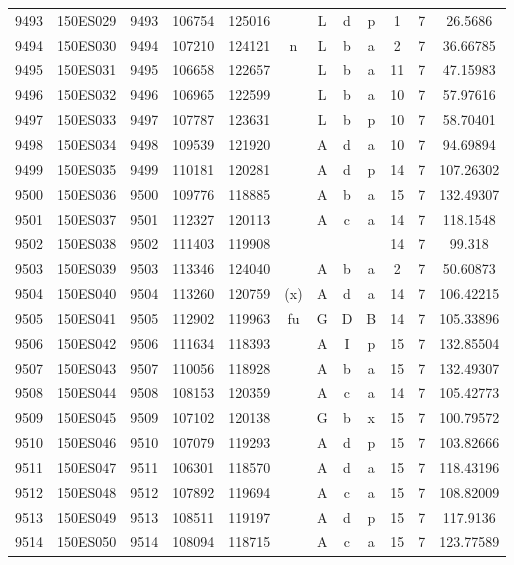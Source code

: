 \begin{tabular}{|*{12}{c|}}
9493 & 150ES029 & 9493 & 106754 & 125016 &  & L & d & p & 1 & 7 & 26.5686 \\ 
9494 & 150ES030 & 9494 & 107210 & 124121 & n & L & b & a & 2 & 7 & 36.66785 \\ 
9495 & 150ES031 & 9495 & 106658 & 122657 &  & L & b & a & 11 & 7 & 47.15983 \\ 
9496 & 150ES032 & 9496 & 106965 & 122599 &  & L & b & a & 10 & 7 & 57.97616 \\ 
9497 & 150ES033 & 9497 & 107787 & 123631 &  & L & b & p & 10 & 7 & 58.70401 \\ 
9498 & 150ES034 & 9498 & 109539 & 121920 &  & A & d & a & 10 & 7 & 94.69894 \\ 
9499 & 150ES035 & 9499 & 110181 & 120281 &  & A & d & p & 14 & 7 & 107.26302 \\ 
9500 & 150ES036 & 9500 & 109776 & 118885 &  & A & b & a & 15 & 7 & 132.49307 \\ 
9501 & 150ES037 & 9501 & 112327 & 120113 &  & A & c & a & 14 & 7 & 118.1548 \\ 
9502 & 150ES038 & 9502 & 111403 & 119908 &  &  &  &  & 14 & 7 & 99.318 \\ 
9503 & 150ES039 & 9503 & 113346 & 124040 &  & A & b & a & 2 & 7 & 50.60873 \\ 
9504 & 150ES040 & 9504 & 113260 & 120759 & (x) & A & d & a & 14 & 7 & 106.42215 \\ 
9505 & 150ES041 & 9505 & 112902 & 119963 & fu & G & D & B & 14 & 7 & 105.33896 \\ 
9506 & 150ES042 & 9506 & 111634 & 118393 &  & A & I & p & 15 & 7 & 132.85504 \\ 
9507 & 150ES043 & 9507 & 110056 & 118928 &  & A & b & a & 15 & 7 & 132.49307 \\ 
9508 & 150ES044 & 9508 & 108153 & 120359 &  & A & c & a & 14 & 7 & 105.42773 \\ 
9509 & 150ES045 & 9509 & 107102 & 120138 &  & G & b & x & 15 & 7 & 100.79572 \\ 
9510 & 150ES046 & 9510 & 107079 & 119293 &  & A & d & p & 15 & 7 & 103.82666 \\ 
9511 & 150ES047 & 9511 & 106301 & 118570 &  & A & d & a & 15 & 7 & 118.43196 \\ 
9512 & 150ES048 & 9512 & 107892 & 119694 &  & A & c & a & 15 & 7 & 108.82009 \\ 
9513 & 150ES049 & 9513 & 108511 & 119197 &  & A & d & p & 15 & 7 & 117.9136 \\ 
9514 & 150ES050 & 9514 & 108094 & 118715 &  & A & c & a & 15 & 7 & 123.77589 \\ 

\end{tabular}
